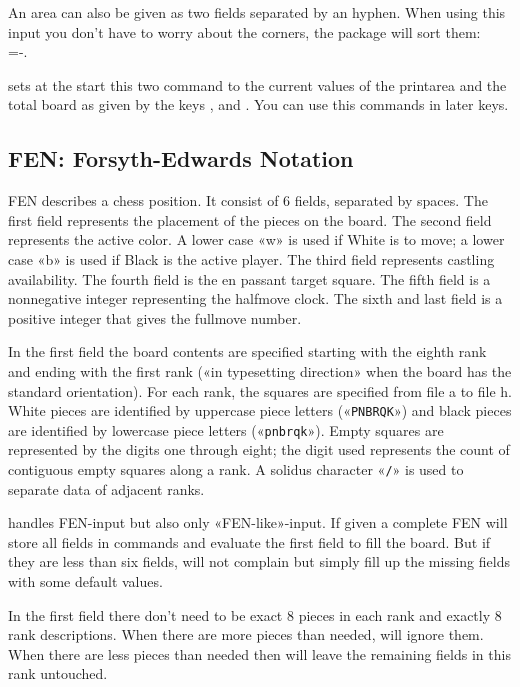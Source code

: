 \documentclass[pagesize,parskip=half-,fontsize=12pt]{scrartcl}
\begin{document}
An area can also be given as two fields separated by an hyphen. When
using this input you don't have to worry about the corners, the
package will sort them:\\
=-.


\DescribeMacro{\printarea} \DescribeMacro{\board} 
sets at the start this two command to the current values of the
printarea and the total board as given by the keys ,
 and . You can use this commands in
later keys.


\subsection{FEN: Forsyth-Edwards Notation}\label{sec:FEN}

FEN describes a chess position. It consist of 6 fields, separated by
spaces. The first field represents the placement of the pieces on
the board. The second field represents the active color.  A lower
case «w» is used if White is to move; a lower case «b» is used if
Black is the active player. The third field represents castling
availability. The fourth field is the en passant target square. The
fifth field is a nonnegative integer representing the halfmove
clock. The sixth and last field is a positive integer that gives the
fullmove number.

In the first field the board contents are specified starting with
the eighth rank and ending with the first rank («in typesetting
direction» when the board has the standard orientation). For each
rank, the squares are specified from file a to file h. White pieces
are identified by uppercase piece letters («\texttt{PNBRQK}») and
black pieces are identified by lowercase  piece letters
(«\texttt{pnbrqk}»). Empty squares are represented by the digits one
through eight; the digit used represents the count of contiguous
empty squares along a rank. A solidus character «\texttt{/}» is used
to separate data of adjacent ranks.

 handles FEN-input but also only «FEN-like»-input. If
given a complete FEN  will store all fields in
commands and evaluate the first field to fill the board. But if they
are less than six fields,  will not complain but
simply fill up the missing fields with some default values.

In the first field there don't need to be exact 8 pieces in each rank
and exactly 8 rank descriptions. When there are more pieces than
needed,  will ignore them. When there are less pieces
than needed then  will leave the remaining fields in
this rank untouched.
\end{document}

